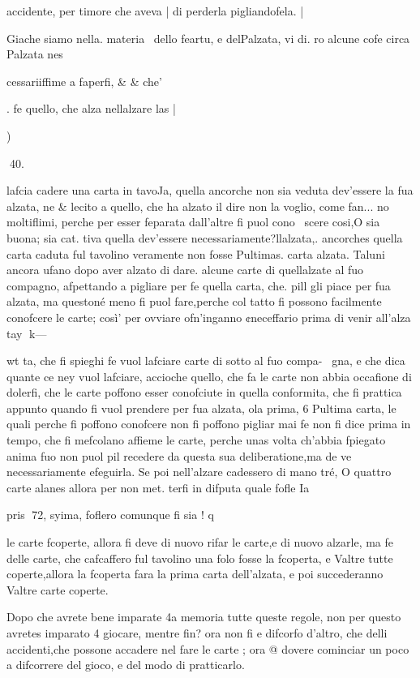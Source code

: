 \documentclass[12pt,a6paper]{article}
\begin{document}
 

 

 

accidente, per timore che aveva |
di perderla pigliandofela. |

Giache siamo nella. materia \
dello feartu, e delPalzata, vi di.
ro alcune cofe circa Palzata nes

 

cessariiffime a faperfi, & & che’

. fe quello, che alza nellalzare
las |

)

 
40.

lafcia cadere una carta in tavoJa, quella ancorche non sia veduta dev’essere la fua alzata, ne
& lecito a quello, che ha alzato
il dire non la voglio, come fan...
no moltiflimi, perche per esser
feparata dall’altre fi puol cono~
scere cosi,O sia buona; sia cat.
tiva quella dev’essere necessariamente?llalzata,. ancorches
quella carta caduta ful tavolino
veramente non fosse Pultimas.
carta alzata. Taluni ancora
ufano dopo aver alzato di dare.
alcune carte di quellalzate al
fuo compagno, afpettando a pigliare per fe quella carta, che.
pill gli piace per fua alzata, ma
questoné meno fi puol fare,perche col tatto fi possono facilmente conofcere le carte; così’
per ovviare ofn’inganno ¢neceffario prima di venir all’alza
tay
k—

wt
ta, che fi spieghi fe vuol lafciare carte di sotto al fuo compa-~
gna, e che dica quante ce ney
vuol lafciare, accioche quello,
che fa le carte non abbia occafione di dolerfi, che le carte
poffono esser conofciute in quella conformita, che fi prattica
appunto quando fi vuol prendere per fua alzata, ola prima, 6
Pultima carta, le quali perche fi
poffono conofcere non fi poffono pigliar mai fe non fi dice prima in tempo, che fi mefcolano
affieme le carte, perche unas
volta ch’abbia fpiegato anima
fuo non puol pil recedere da
questa sua deliberatione,ma de
ve necessariamente efeguirla.
Se poi nell’alzare cadessero
di mano tré, O quattro carte
alanes allora per non met.
terfi in difputa quale fofle Ia

pris
72,
syima, foflero comunque fi sia
! q

le carte fcoperte, allora fi deve
di nuovo rifar le carte,e di nuovo alzarle, ma fe delle carte,
che cafcaffero ful tavolino una
folo fosse la fcoperta, e Valtre
tutte coperte,allora la fcoperta
fara la prima carta dell’alzata,
e poi succederanno Valtre carte
coperte.

Dopo che avrete bene imparate 4a memoria tutte queste regole, non per questo avretes
imparato 4 giocare, mentre fin?
ora non fi e difcorfo d’altro,
che delli accidenti,che possone
accadere nel fare le carte ; ora
@ dovere cominciar un poco a
difcorrere del gioco, e del modo di pratticarlo.
\end{document}
